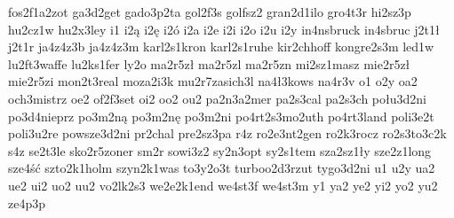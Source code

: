 {fos2f1a2zot
ga3d2get
gado3p2ta
gol2f3s
golfsz2
gran2d1ilo
gro4t3r
hi2sz3p
hu2cz1w
hu2x3ley
i1
i2ą
i2ę
i2ó
i2a
i2e
i2i
i2o
i2u
i2y
in4nsbruck
in4sbruc
j2t1ł
j2t1r
ja4z4z3b
ja4z4z3m
karl2s1kron
karl2s1ruhe
kir2chhoff
kongre2s3m
led1w
lu2ft3waffe
lu2ks1fer
ly2o
ma2r5zł
ma2r5zl
ma2r5zn
mi2sz1masz
mie2r5zł
mie2r5zi
mon2t3real
moza2i3k
mu2r7zasich3l
na4ł3kows
na4r3v
o1
o2y
oa2
och3mistrz
oe2
of2f3set
oi2
oo2
ou2
pa2n3a2mer
pa2s3cal
pa2s3ch
połu3d2ni
po3d4nieprz
po3m2ną
po3m2nę
po3m2ni
po4rt2s3mo2uth
po4rt3land
poli3e2t
poli3u2re
powsze3d2ni
pr2chal
pre2sz3pa
r4z
ro2e3nt2gen
ro2k3rocz
ro2s3to3c2k
s4z
se2t3le
sko2r5zoner
sm2r
sowi3z2
sy2n3opt
sy2s1tem
sza2sz1ły
sze2z1long
sze4ść
szto2k1holm
szyn2k1was
to3y2o3t
turboo2d3rzut
tygo3d2ni
u1
u2y
ua2
ue2
ui2
uo2
uu2
vo2lk2s3
we2e2k1end
we4st3f
we4st3m
y1
ya2
ye2
yi2
yo2
yu2
ze4p3p
}
